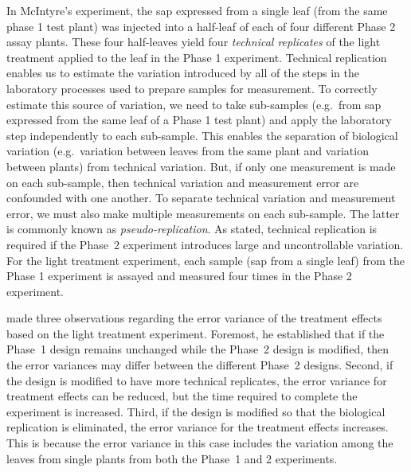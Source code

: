  
In McIntyre's experiment, the sap expressed from a single leaf (from the same phase 1 test plant) was injected into a half-leaf of each of four different Phase 2 assay plants. These four half-leaves yield four \emph{technical replicates} of the light treatment applied to the leaf in the Phase 1 experiment. Technical replication enables us to estimate the variation introduced by all of the steps in the laboratory processes used to prepare samples for measurement. To correctly estimate this source of variation, we need to take sub-samples (e.g.\ from sap expressed from the same leaf of a Phase 1 test plant) and apply the laboratory step independently to each sub-sample. This enables the separation of biological variation (e.g.\ variation between leaves from the same plant and variation between plants) from technical variation. But, if only one measurement is made on each sub-sample, then technical variation and measurement error are confounded with one another. To separate technical variation and measurement error, we must also make multiple measurements on each sub-sample. The latter is commonly known as \emph{pseudo-replication}. As \cite{McIntyre1955} stated, technical replication is required if the Phase~2 experiment introduces large and uncontrollable variation. For the light treatment experiment, each sample (sap from a single leaf) from the Phase 1 experiment is assayed and measured four times in the Phase 2 experiment. 

\cite{McIntyre1955} made three observations regarding the error variance of the treatment effects based on the light treatment experiment. Foremost, he established that if the Phase~1 design remains unchanged while the Phase~2 design is modified, then the error variances may differ between the different Phase~2 designs. Second, if the design is modified to have more technical replicates, the error variance for treatment effects can be reduced, but the time required to complete the experiment is increased. Third, if the design is modified so that the biological replication is eliminated, the error variance for the treatment effects increases. This is because the error variance in this case includes the variation among the leaves from single plants from both the Phase~1 and 2 experiments.

